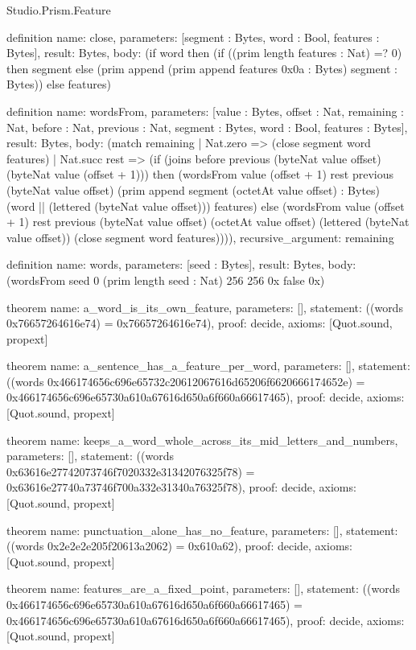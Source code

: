 \begin{lexlean}{Studio.Prism.Feature}
\begin{semanticmodule}
definition{
  name: close,
  parameters: [segment : Bytes, word : Bool, features : Bytes],
  result: Bytes,
  body: (if word then (if ((prim length features : Nat) =? 0) then segment else (prim append (prim append features 0x0a : Bytes) segment : Bytes)) else features)
}

definition{
  name: wordsFrom,
  parameters: [value : Bytes, offset : Nat, remaining : Nat, before : Nat, previous : Nat, segment : Bytes, word : Bool, features : Bytes],
  result: Bytes,
  body: (match remaining
    | Nat.zero => (close segment word features)
    | Nat.succ rest => (if (joins before previous (byteNat value offset) (byteNat value (offset + 1))) then (wordsFrom value (offset + 1) rest previous (byteNat value offset) (prim append segment (octetAt value offset) : Bytes) (word || (lettered (byteNat value offset))) features) else (wordsFrom value (offset + 1) rest previous (byteNat value offset) (octetAt value offset) (lettered (byteNat value offset)) (close segment word features)))),
  recursive_argument: remaining
}

definition{
  name: words,
  parameters: [seed : Bytes],
  result: Bytes,
  body: (wordsFrom seed 0 (prim length seed : Nat) 256 256 0x false 0x)
}

theorem{
  name: a_word_is_its_own_feature,
  parameters: [],
  statement: ((words 0x76657264616e74) = 0x76657264616e74),
  proof: decide{},
  axioms: [Quot.sound, propext]
}

theorem{
  name: a_sentence_has_a_feature_per_word,
  parameters: [],
  statement: ((words 0x466174656c696e65732c20612067616d65206f6620666174652e) = 0x466174656c696e65730a610a67616d650a6f660a66617465),
  proof: decide{},
  axioms: [Quot.sound, propext]
}

theorem{
  name: keeps_a_word_whole_across_its_mid_letters_and_numbers,
  parameters: [],
  statement: ((words 0x63616e27742073746f7020332e31342076325f78) = 0x63616e27740a73746f700a332e31340a76325f78),
  proof: decide{},
  axioms: [Quot.sound, propext]
}

theorem{
  name: punctuation_alone_has_no_feature,
  parameters: [],
  statement: ((words 0x2e2e2e205f20613a2062) = 0x610a62),
  proof: decide{},
  axioms: [Quot.sound, propext]
}

theorem{
  name: features_are_a_fixed_point,
  parameters: [],
  statement: ((words 0x466174656c696e65730a610a67616d650a6f660a66617465) = 0x466174656c696e65730a610a67616d650a6f660a66617465),
  proof: decide{},
  axioms: [Quot.sound, propext]
}
\end{semanticmodule}
\end{lexlean}
